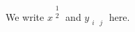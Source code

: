 \documentclass[12pt]{article}
\begin{document}
We write $x^{\begin{smallmatrix} 1 \\ 2 \end{smallmatrix}}$ and $y_{\begin{smallmatrix} i & j \end{smallmatrix}}$ here.
\end{document}
